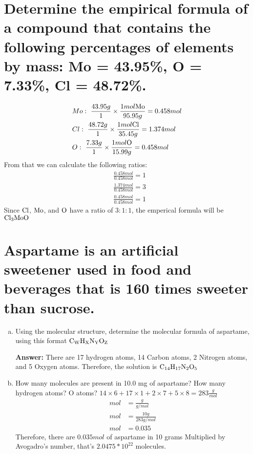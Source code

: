 \documentclass[11pt]{article}
\begin{document}
\section{Determine the empirical formula of a compound that contains the following percentages of elements by mass: Mo = 43.95\%, O = 7.33\%, Cl = 48.72\%.}
\label{sec:org16ea9d4}
\begin{align*}
&Mo:\ \frac{43.95g}{1}\times\frac{1mol\ce{Mo}}{95.95g}=0.458mol\\
&Cl:\ \frac{48.72g}{1}\times\frac{1mol\ce{Cl}}{35.45g}=1.374mol\\
&O:\ \frac{7.33g}{1}\times\frac{1mol\ce{O}}{15.99g}=0.458mol
\end{align*}
From that we can calculate the following ratios:
\begin{align*}
&\frac{0.458mol}{0.458mol}=1\\
&\frac{1.374mol}{0.458mol}=3\\
&\frac{0.458mol}{0.458mol}=1
\end{align*}
 Since \(\ce{Cl}\), \(\ce{Mo}\), and  \(\ce{O}\) have a ratio of \(3:1:1\), the
emperical formula will be  \(\ce{Cl3MoO}\)

\section{Aspartame is an artificial sweetener used in food and beverages that is 160 times sweeter than sucrose.}
\label{sec:org89e3323}
\begin{enumerate}[(a)]
\item Using the molecular structure, determine the molecular formula of aspartame,
using this format \(\ce{C_{W}H_{X}N_{Y}O_{Z}}\)

\textbf{Answer:} There are 17 hydrogen atoms, 14 Carbon atoms, 2 Nitrogen atoms, and 5 Oxygen atoms. Therefore, the solution is \(\ce{C14H17N2O5}\)
\item How many molecules are present in 10.0 mg of aspartame? How many hydrogen atoms? O atoms?
\(14\times6+17\times1+2\times7+5\times8=283\frac{g}{mol}\)
\begin{align*}
mol&=\frac{g}{g/mol}\\
mol&=\frac{10g}{283g/mol}\\
mol&=0.035
\end{align*}
Therefore, there are \(0.035mol\) of aspartame in 10 grams
Multiplied by Avogadro's number, that's \(2.0475*10^{22}\) molecules.
\end{enumerate}
\end{document}
